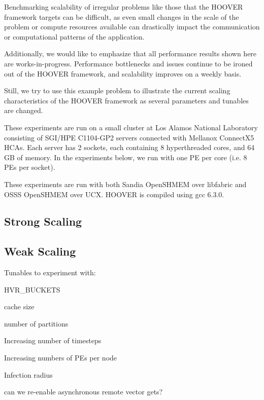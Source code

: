 Benchmarking scalability of irregular problems like those that the HOOVER
framework targets can be difficult, as even small changes in the scale of the
problem or compute resources available can drastically impact the communication
or computational patterns of the application.

Additionally, we would like to emphasize that all performance results shown here
are works-in-progress. Performance bottlenecks and issues continue to be ironed
out of the HOOVER framework, and scalability improves on a weekly basis.

Still, we try to use this example problem to illustrate the current scaling
characteristics of the HOOVER framework as several parameters and tunables are
changed.

These experiments are run on a small cluster at Los Alamos National Laboratory
consisting of SGI/HPE C1104-GP2 servers connected with Mellanox ConnectX5 HCAs.
Each server has 2 sockets, each containing 8 hyperthreaded cores, and 64 GB of
memory. In the experiments below, we run with one PE per core (i.e. 8 PEs per
socket).

These experiments are run with both Sandia OpenSHMEM over libfabric and OSSS
OpenSHMEM over UCX. HOOVER is compiled using gcc 6.3.0.

\subsection{Strong Scaling}



\subsection{Weak Scaling}

Tunables to experiment with:

HVR\_BUCKETS

cache size

number of partitions

Increasing number of timesteps

Increasing numbers of PEs per node

Infection radius

can we re-enable asynchronous remote vector gets?

